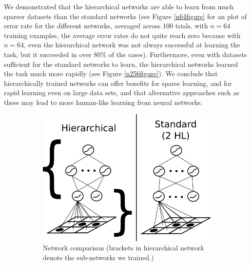 \documentclass[10pt]{article}
\begin{document}
{We demonstrated that the hierarchical networks are able to learn from much sparser datasets than the standard networks (see Figure \ref{n64figure} for an plot of error rate for the different networks, averaged across 100 trials, with $n = 64$ training examples, the average error rates do not quite reach zero because with $n = 64$, even the hierarchical network was not always successful at learning the task, but it succeeded in over 80\% of the cases). Furthermore, even with datasets sufficient for the standard networks to learn, the hierarchical networks learned the task much more rapidly (see Figure \ref{n256figure}). We conclude that hierarchically trained networks can offer benefits for sparse learning, and for rapid learning even on large data sets, and that alternative approaches such as these may lead to more human-like learning from neural networks.
\begin{figure}[H]
    \centering
    \begin{subfigure}[c]{0.35\textwidth}
	\centering
	\includegraphics[width=\textwidth]{figures/hierarchical_NN_abstract_figure.png}
	\caption{Network comparison (brackets in hierarchical network denote the sub-networks we trained.)}
	\label{networkdiagram}
    \end{subfigure}
    \begin{subfigure}[c]{0.3\textwidth}
	\centering

\end{subfigure}
\end{figure}}
\end{document}
